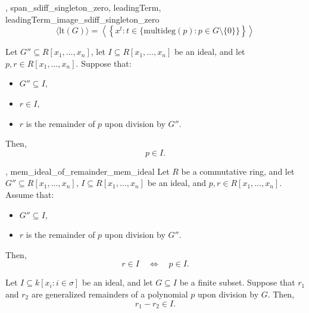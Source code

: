\begin{lemma}\label{leadingTerm_ideal_span_monomial'}
  \leanok
  ,
{span_sdiff_singleton_zero},
{leadingTerm},
{leadingTerm_image_sdiff_singleton_zero}
  \[
\langle \mathrm{lt}(G) \rangle = \left\langle \left\{ x^t : t \in \{ \mathrm{multideg}(p) : p \in G \setminus \{0\} \} \right\} \right\rangle
\]

\end{lemma}

\begin{lemma}\label{mem_ideal_of_remainder_mem_ideal}
  \leanok
  Let \( G'' \subseteq R[x_1, \dots, x_n] \), let \( I \subseteq R[x_1, \dots, x_n] \) be an ideal,
and let \( p, r \in R[x_1, \dots, x_n] \). Suppose that:
\begin{itemize}
\item \( G'' \subseteq I \),
\item \( r \in I \),
\item \( r \) is the remainder of \( p \) upon division by \( G'' \).
\end{itemize}
Then,
\[
p \in I.
\]

\end{lemma}

\begin{lemma}\label{remainder_mem_ideal_iff}
  \leanok
  ,
{mem_ideal_of_remainder_mem_ideal}
  Let \( R \) be a commutative ring, and let \( G'' \subseteq R[x_1, \dots, x_n] \), \( I \subseteq R[x_1, \dots, x_n] \) be an ideal, and \( p, r \in R[x_1, \dots, x_n] \).
Assume that:
\begin{itemize}
\item \( G'' \subseteq I \),
\item \( r \) is the remainder of \( p \) upon division by \( G'' \).
\end{itemize}
Then,
\[
r \in I \quad \Longleftrightarrow \quad p \in I.
\]

\end{lemma}

\begin{lemma}\label{remainder_sub_remainder_mem_ideal}
  \leanok
  Let \( I \subseteq k[x_i : i \in \sigma] \) be an ideal, and let \( G \subseteq I \) be a finite subset.
Suppose that \( r_1 \) and \( r_2 \) are generalized remainders of a polynomial \( p \) upon division by \( G \).
Then,
\[
r_1 - r_2 \in I.
\]

\end{lemma}

